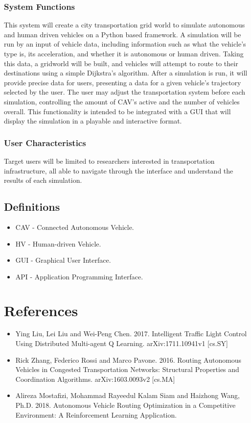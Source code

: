 \documentclass[10pt,letterpaper,draftclsnofoot,onecolumn]{IEEEtran}
\begin{document}
		\subsubsection{System Functions}
		This system will create a city transportation grid world to simulate autonomous and human driven vehicles on a Python based framework. A simulation will be run by an input of vehicle data, including information such as what the vehicle’s type is, its acceleration, and whether it is autonomous or human driven. Taking this data, a gridworld will be built, and vehicles will attempt to route to their destinations using a simple Dijkstra’s algorithm. After a simulation is run, it will provide precise data for users, presenting a data for a given vehicle’s trajectory selected by the user. The user may adjust the transportation system before each simulation, controlling the amount of CAV’s active and the number of vehicles overall. This functionality is intended to be integrated with a GUI that will display the simulation in a playable and interactive format.
		\subsubsection{User Characteristics}
		Target users will be limited to researchers interested in transportation infrastructure, all able to navigate through the interface and understand the results of each simulation.
	\subsection{Definitions}
		\begin{itemize}
			\item CAV - Connected Autonomous Vehicle.
			\item HV - Human-driven Vehicle.
			\item GUI - Graphical User Interface.
			\item API - Application Programming Interface.
		\end{itemize}
\section{References}
\begin{itemize}
\item Ying Liu, Lei Liu and Wei-Peng Chen. 2017. Intelligent Traffic Light Control Using Distributed Multi-agent Q Learning. arXiv:1711.10941v1 [cs.SY]
\item Rick Zhang, Federico Rossi and Marco Pavone. 2016. Routing Autonomous Vehicles in Congested Transportation Networks: Structural Properties and Coordination Algorithms. arXiv:1603.0093v2 [cs.MA]
\item Alireza Mostafizi, Mohammad Rayeedul Kalam Siam and Haizhong Wang, Ph.D. 2018.  Autonomous Vehicle Routing Optimization in a Competitive Environment: A Reinforcement Learning Application.
\end{itemize}
\end{document}
